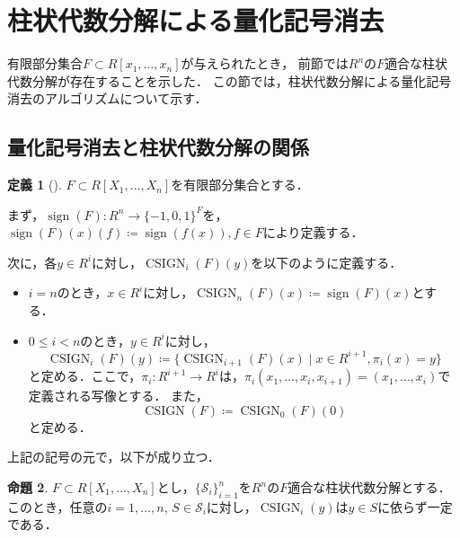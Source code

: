 \documentclass[uplatex, dvipdfmx]{jsarticle}
\numberwithin{equation}{section}
\newcommand{\map}[3]{{#1}\colon{#2}\rightarrow{#3}}
\DeclareMathOperator{\sign}{sign}
\DeclareMathOperator{\CSIGN}{CSIGN}
\theoremstyle{definition}
\newtheorem{definition}{定義}[section]
\newtheorem{proposition}[definition]{命題}
\begin{document}
\section{柱状代数分解による量化記号消去}

有限部分集合$F \subset R[x_1, \dots, x_n]$が与えられたとき，
前節では$R^n$の$F$適合な柱状代数分解が存在することを示した．
この節では，柱状代数分解による量化記号消去のアルゴリズムについて示す．

\subsection{量化記号消去と柱状代数分解の関係}
\begin{definition}[{\cite[Notation 11.7]{MR2248869}}]
     $F \subset R[X_1, \dots, X_n]$を有限部分集合とする．

     まず，$\map{\sign(F)}{R^n}{\{-1, 0, 1\}^F}$を，
     $\sign(F)(x)(f)\coloneqq \sign(f(x)), f \in F$により定義する．

     次に，各$y \in R^i$に対し，$\CSIGN_i(F)(y)$を以下のように定義する．
     \begin{itemize}
          \item $i=n$のとき，$x \in R^i$に対し，$\CSIGN_n(F)(x)\coloneqq \sign(F)(x) $とする．
          \item $0 \leq i<n$のとき，$y \in R^i$に対し，
          \begin{equation}
               \CSIGN_i(F)(y) \coloneqq \{\CSIGN_{i+1}(F)(x) \mid x \in  R^{i+1}, \pi_i(x) = y\}
          \end{equation}
          と定める．ここで，$\map{\pi_i}{R^{i+1}}{R^i}$は，$\pi_i(x_1, \dots, x_i, x_{i+1}) = (x_1, \dots, x_i)$で定義される写像とする．
          また，
          \begin{equation}
               \CSIGN(F) \coloneqq \CSIGN_0(F)(0)
          \end{equation}
          と定める．
     \end{itemize}
\end{definition}

上記の記号の元で，以下が成り立つ．
\begin{proposition} \label{proposition:independence-of-CSIGN}
     $F \subset R[X_1, \dots, X_n]$とし，$\{\mathcal{S}_i\}_{i=1}^n$を$R^n$の$F$適合な柱状代数分解とする．
     このとき，任意の$i=1, \dots, n$, $S \in \mathcal{S}_i$に対し，$\CSIGN_i(y)$は$y \in S$に依らず一定である．
\end{proposition}
\end{document}

